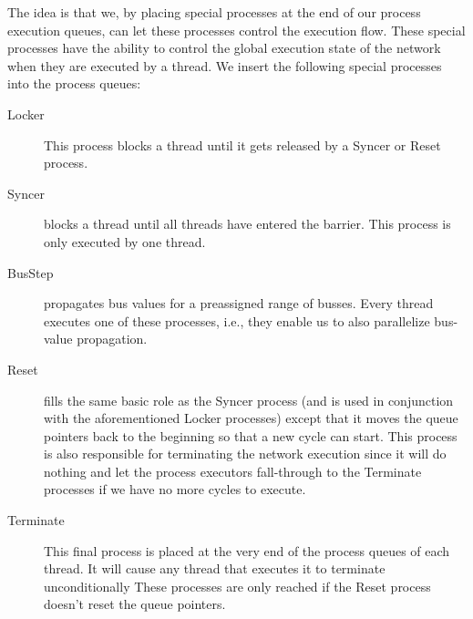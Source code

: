 The idea is that we, by placing special processes at the end of our
process execution queues, can let these processes control the
execution flow. These special processes have the
ability to control the global execution state of the network when they
are executed by a thread. We insert the following special processes
into the process queues:


\begin{description}
\item[Locker] This process blocks a thread until it gets released by a
  Syncer or Reset process.
\item[Syncer] blocks a thread until all threads have entered the
  barrier. This process is only executed by one thread.
\item[BusStep] propagates bus values for a preassigned range of
  busses. Every thread executes one of these processes, i.e., they
  enable us to also parallelize bus-value propagation.
\item[Reset] fills the same basic role as the Syncer process (and
  is used in conjunction with the aforementioned Locker processes)
  except that it moves the queue pointers back to the beginning so
  that a new cycle can start. This process is also responsible for terminating the
  network execution since it will do nothing and let the process
  executors fall-through to the Terminate
  processes if we have no more cycles to execute.
\item[Terminate] This final process is placed at the very end of the
  process queues of each
  thread. It will cause any thread that executes it to terminate
  unconditionally  These processes are only reached if the Reset process
  doesn't reset the queue pointers.
\end{description}

